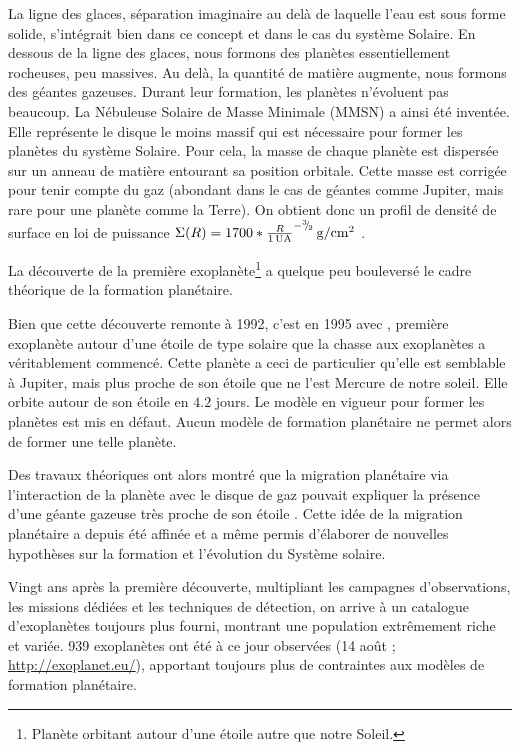 La ligne des glaces, séparation imaginaire au delà de laquelle l'eau est sous forme solide, s'intégrait bien dans ce concept et
dans le cas du système Solaire. En dessous de la ligne des glaces, nous formons des planètes essentiellement rocheuses, peu
massives. Au delà, la quantité de matière augmente, nous formons des géantes gazeuses. Durant leur formation, les planètes
n'évoluent pas beaucoup. La Nébuleuse Solaire de Masse Minimale (MMSN) a ainsi été inventée. Elle représente le disque le moins
massif qui est nécessaire pour former les planètes du système Solaire. Pour cela, la masse de chaque planète est dispersée
sur un anneau de matière entourant sa position orbitale.
Cette masse est corrigée pour tenir compte du gaz (abondant dans le cas de géantes comme Jupiter, mais rare pour une planète
comme la Terre). On obtient donc un profil de densité de surface en loi de puissance $\Sigma(R)=1700 * \frac{R}{1\mathrm{\thinspace UA}}^{-{{}^{3\!\!}/ _{\!2}}}\mathrm{\thinspace g/cm^2}$ \citep{
weidenschilling1977distribution, hayashi1981structure}.

La découverte de la première exoplanète\footnote{Planète orbitant autour d'une étoile autre que notre Soleil.}
\citep{wolszczan1992planetary} a quelque peu bouleversé le cadre théorique de la formation planétaire.

Bien que cette découverte remonte à 1992, c'est en 1995 avec  \citep{mayor1995jupiter}, première exoplanète autour d'une étoile de type solaire que la chasse aux
exoplanètes a véritablement commencé. Cette planète a ceci de particulier qu'elle est semblable à Jupiter, mais plus proche de
son étoile que ne l'est Mercure de notre soleil. Elle orbite autour de son étoile en $4.2$ jours. Le modèle en
vigueur pour former les planètes est mis en défaut. Aucun modèle de formation planétaire ne permet alors de former une telle
planète. 

Des travaux théoriques ont alors montré que la migration planétaire via l'interaction de la planète avec le disque de gaz
pouvait expliquer la présence d'une géante gazeuse très proche de son étoile \citep{lin1986tidal, ward1989rapid, ward1997protoplanet}. Cette idée de la migration planétaire a depuis été
affinée et a même permis d'élaborer de nouvelles hypothèses sur la formation et l'évolution du Système solaire. 

Vingt ans après la première découverte, multipliant les campagnes d'observations, les missions dédiées et les techniques
de détection, on arrive à un catalogue d'exoplanètes toujours plus fourni, montrant une
population extrêmement riche et variée. 939 exoplanètes ont été à ce jour observées (14 août ; \url{http://exoplanet.eu/}),
apportant toujours plus de contraintes aux modèles de formation planétaire.


